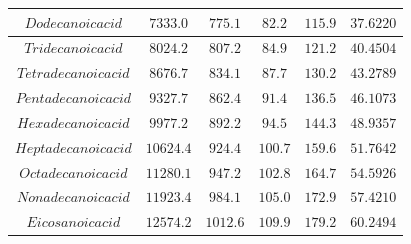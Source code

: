 \documentclass[a4paper,12pt]{article}
\begin{document}
\begin{table}[h]
{\begin{tabular}{c|c|c|c|c|c}
    $Dodecanoic acid$   &  $7333.0$  &    $775.1$  &  $82.2$  &    $115.9$  &    $37.6220$   \\ \hline

    $Tridecanoic acid$   &  $8024.2$  &    $807.2$  &  $84.9$  &    $121.2$  &    $40.4504$  \\ \hline

    $Tetradecanoic acid$   &  $8676.7$  &    $834.1$  &	  $87.7$  &    $130.2$  &    $43.2789$  \\ \hline

    $Pentadecanoic acid$   &  $9327.7$  &    $862.4$  &	  $91.4$  &    $136.5$  &    $46.1073$  \\ \hline

    $Hexadecanoic acid$   &  $9977.2$  &    $892.2$  &	  $94.5$  &    $144.3$  &    $48.9357$  \\ \hline

    $Heptadecanoic acid$   &  $10624.4$  &    $924.4$  &  $100.7$  &    $159.6$  &    $51.7642$  \\ \hline

    $Octadecanoic acid$   &  $11280.1$  &    $947.2$  &	  $102.8$  &    $164.7$  &    $54.5926$  \\ \hline

    $Nonadecanoic acid$   &  $11923.4$  &    $984.1$  &	  $105.0$  &    $172.9$  &    $57.4210$  \\ \hline

    $Eicosanoic acid$   &  $12574.2$  &    $1012.6$  &	  $109.9$  &    $179.2$  &    $60.2494$  \\ \hline

	\end{tabular}}
	
	\label{table1}
\end{table}
\end{document}
